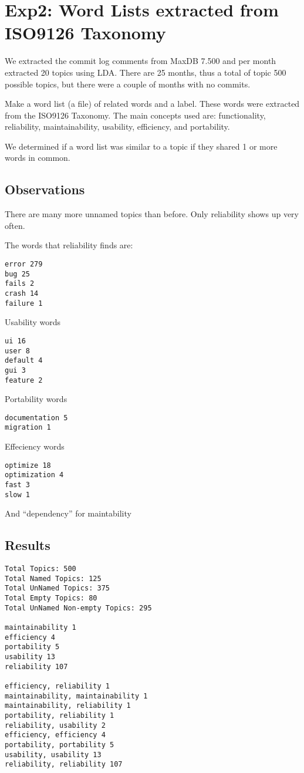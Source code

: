 \documentclass{article}
\begin{document}
\section{Exp2: Word Lists extracted from ISO9126 Taxonomy}

We extracted the commit log comments from MaxDB 7.500 and per month
extracted 20 topics using LDA. There are 25 months, thus a total of
topic 500 possible topics, but there were a couple of months with no
commits.

Make a word list (a file) of related words and a label.  These words
were extracted from the ISO9126 Taxonomy.  The main concepts used are:
functionality, reliability, maintainability, usability, efficiency,
and portability.

We determined if a word list was similar to a topic if they shared 1
or more words in common.

\subsection{Observations}

There are many more unnamed topics than before. Only reliability shows up very often.

The words that reliability finds are:
\begin{verbatim}
error 279
bug 25
fails 2
crash 14
failure 1
\end{verbatim}

Usability words
\begin{verbatim}
ui 16
user 8
default 4
gui 3
feature 2
\end{verbatim}

Portability words
\begin{verbatim}
documentation 5
migration 1
\end{verbatim}

Effeciency words
\begin{verbatim}
optimize 18
optimization 4
fast 3
slow 1
\end{verbatim}

And ``dependency'' for maintability

\subsection{Results}


\begin{verbatim}
Total Topics: 500
Total Named Topics: 125
Total UnNamed Topics: 375
Total Empty Topics: 80
Total UnNamed Non-empty Topics: 295

maintainability 1
efficiency 4
portability 5
usability 13
reliability 107

efficiency, reliability 1
maintainability, maintainability 1
maintainability, reliability 1
portability, reliability 1
reliability, usability 2
efficiency, efficiency 4
portability, portability 5
usability, usability 13
reliability, reliability 107
\end{verbatim}
\end{document}

